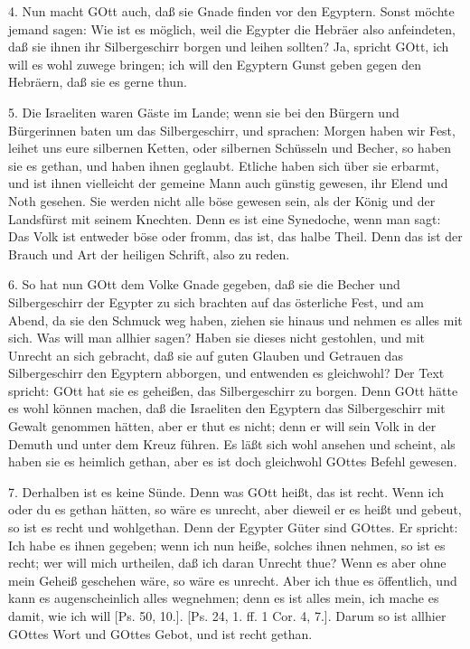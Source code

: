 4. Nun macht GOtt auch, daß sie Gnade finden vor den Egyptern. Sonst möchte jemand sagen: Wie ist es möglich, weil die Egypter die Hebräer also anfeindeten, daß sie ihnen ihr Silbergeschirr borgen und leihen sollten? Ja, spricht GOtt, ich will es wohl zuwege bringen; ich will den Egyptern Gunst geben gegen den Hebräern, daß sie es gerne thun.

5. Die Israeliten waren Gäste im Lande; wenn sie bei den Bürgern und Bürgerinnen baten um das Silbergeschirr, und sprachen: Morgen haben wir Fest, leihet uns eure silbernen Ketten, oder silbernen Schüsseln und Becher, so haben sie es gethan, und haben ihnen geglaubt. Etliche haben sich über sie erbarmt, und ist ihnen vielleicht der gemeine Mann auch günstig gewesen, ihr Elend und Noth gesehen. Sie werden nicht alle böse gewesen sein, als der König und der Landsfürst mit seinem Knechten. Denn es ist eine Synedoche, wenn man sagt: Das Volk ist entweder böse oder fromm, das ist, das halbe Theil. Denn das ist der Brauch und Art der heiligen Schrift, also zu reden.

6. So hat nun GOtt dem Volke Gnade gegeben, daß sie die Becher und Silbergeschirr der Egypter zu sich brachten auf das österliche Fest, und am Abend, da sie den Schmuck weg haben, ziehen sie hinaus und nehmen es alles mit sich. Was will man allhier sagen? Haben sie dieses nicht gestohlen, und mit Unrecht an sich gebracht,
daß sie auf guten Glauben und Getrauen das Silbergeschirr den Egyptern abborgen, und entwenden es gleichwohl? Der Text spricht: GOtt hat sie es geheißen, das Silbergeschirr zu borgen. Denn GOtt hätte es wohl können machen, daß die Israeliten den Egyptern das Silbergeschirr mit Gewalt genommen hätten, aber er thut es nicht; denn er will sein Volk in der Demuth und unter dem Kreuz führen. Es läßt sich wohl ansehen und scheint, als haben sie es heimlich gethan, aber es ist doch gleichwohl GOttes Befehl gewesen.

7. Derhalben ist es keine Sünde. Denn was GOtt heißt, das ist recht. Wenn ich oder du es gethan hätten, so wäre es unrecht, aber dieweil er es heißt und gebeut, so ist es recht und wohlgethan. Denn der Egypter Güter sind GOttes. Er spricht: Ich habe es ihnen gegeben; wenn ich nun heiße, solches ihnen nehmen, so ist es recht; wer will mich urtheilen, daß ich daran Unrecht thue? Wenn es aber ohne mein Geheiß geschehen wäre, so wäre es unrecht. Aber ich thue es öffentlich, und kann es augenscheinlich alles wegnehmen; denn es ist alles mein, ich mache es damit, wie ich will [Ps. 50, 10.]. [Ps. 24, 1. ff. 1 Cor. 4, 7.]. Darum so ist allhier GOttes Wort und GOttes Gebot, und ist recht gethan.

